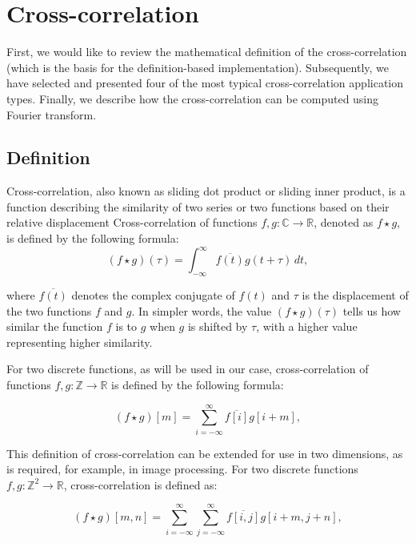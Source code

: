 \section{Cross-correlation}\label{sec:cross}

First, we would like to review the mathematical definition of the cross-correlation (which is the basis for the definition-based implementation). Subsequently, we have selected and presented four of the most typical cross-correlation application types. Finally, we describe how the cross-correlation can be computed using Fourier transform.

\subsection{Definition}\label{sec:cross_corr_def}

Cross-correlation, also known as sliding dot product or sliding inner product, is a function describing the similarity of two series or two functions based on their relative displacement
Cross-correlation of functions $f,g: \mathbb{C} \rightarrow \mathbb{R}$, denoted as \(f \star g\), is defined by the following formula:
\[
	(f \star g)(\tau) = \int_{-\infty}^{\infty} \overline{f(t)}g(t + \tau) \,dt,
\] 

where \(\overline{f(t)}\) denotes the complex conjugate of \(f(t)\) and \(\tau\) is the displacement of the two functions \(f\) and \(g\). In simpler words, the value \((f \star g)(\tau)\) tells us how similar the function \(f\) is to \(g\) when \(g\) is shifted by \(\tau\), with a higher value representing higher similarity.

For two discrete functions, as will be used in our case, cross-correlation of functions \( f, g: \mathbb{Z} \rightarrow \mathbb{R} \) is defined by the following formula:

\[
(f \star g)[m] = \sum_{i=-\infty}^{\infty} \overline{f[i]}g[i + m],
\] 


This definition of cross-correlation can be extended for use in two dimensions, as is required, for example, in image processing.
For two discrete functions \( f, g : \mathbb{Z}^2 \rightarrow \mathbb{R} \), cross-correlation is defined as:

\[
(f \star g)[m,n] = \sum_{i=-\infty}^{\infty} \sum_{j=-\infty}^{\infty} \overline{f[i,j]}g[i + m,j + n],
\]

